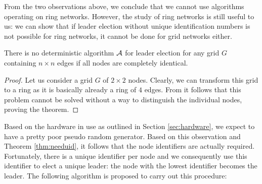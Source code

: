 From the two observations above, we conclude that we cannot use algorithms operating on ring networks. However, the study of ring networks is still useful to us: we can show that if leader election without unique identification numbers is not possible for ring networks, it cannot be done for grid networks either.
\\
\begin{theorem} \label{thm:needuid}
There is no deterministic algorithm $\mathcal{A}$ for leader election for any grid $G$ containing $n \times n$ edges if all nodes are completely identical.
\end{theorem}
\begin{proof}
Let us consider a grid $G$ of $2 \times 2$ nodes. Clearly, we can transform this grid to a ring as it is basically already a ring of $4$ edges. From \cite[Theorem 3.1]{lynch96distalgo} it follows that this problem cannot be solved without a way to distinguish the individual nodes, proving the theorem.
\end{proof}

Based on the hardware in use as outlined in Section \ref{sec:hardware}, we expect to have a pretty poor pseudo random generator. Based on this observation and Theorem \ref{thm:needuid}, it follows that the node identifiers are actually required. Fortunately, there is a unique identifier per node and we consequently use this identifier to elect a unique leader: the node with the lowest identifier becomes the leader. The following algorithm is proposed to carry out this procedure:


